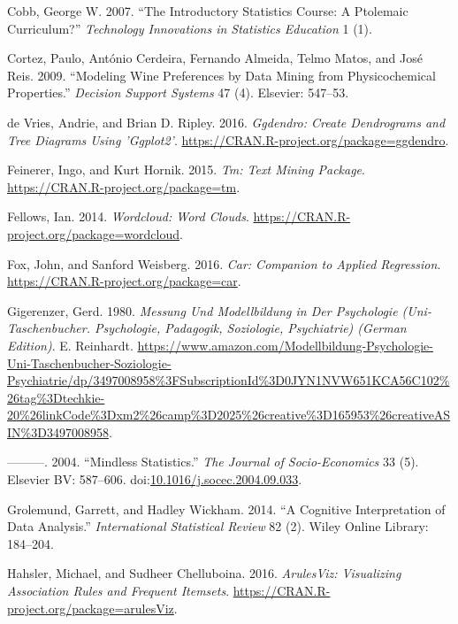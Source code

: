 \documentclass[12pt,]{book}
\begin{document}
\hypertarget{ref-cobb2007introductory}{}
Cobb, George W. 2007. ``The Introductory Statistics Course: A Ptolemaic
Curriculum?'' \emph{Technology Innovations in Statistics Education} 1
(1).

\hypertarget{ref-cortez2009modeling}{}
Cortez, Paulo, António Cerdeira, Fernando Almeida, Telmo Matos, and José
Reis. 2009. ``Modeling Wine Preferences by Data Mining from
Physicochemical Properties.'' \emph{Decision Support Systems} 47 (4).
Elsevier: 547--53.

\hypertarget{ref-R-ggdendro}{}
de Vries, Andrie, and Brian D. Ripley. 2016. \emph{Ggdendro: Create
Dendrograms and Tree Diagrams Using 'Ggplot2'}.
\url{https://CRAN.R-project.org/package=ggdendro}.

\hypertarget{ref-R-tm}{}
Feinerer, Ingo, and Kurt Hornik. 2015. \emph{Tm: Text Mining Package}.
\url{https://CRAN.R-project.org/package=tm}.

\hypertarget{ref-R-wordcloud}{}
Fellows, Ian. 2014. \emph{Wordcloud: Word Clouds}.
\url{https://CRAN.R-project.org/package=wordcloud}.

\hypertarget{ref-R-car}{}
Fox, John, and Sanford Weisberg. 2016. \emph{Car: Companion to Applied
Regression}. \url{https://CRAN.R-project.org/package=car}.

\hypertarget{ref-9783497008957}{}
Gigerenzer, Gerd. 1980. \emph{Messung Und Modellbildung in Der
Psychologie (Uni-Taschenbucher. Psychologie, Padagogik, Soziologie,
Psychiatrie) (German Edition)}. E. Reinhardt.
\url{https://www.amazon.com/Modellbildung-Psychologie-Uni-Taschenbucher-Soziologie-Psychiatrie/dp/3497008958\%3FSubscriptionId\%3D0JYN1NVW651KCA56C102\%26tag\%3Dtechkie-20\%26linkCode\%3Dxm2\%26camp\%3D2025\%26creative\%3D165953\%26creativeASIN\%3D3497008958}.

\hypertarget{ref-Gigerenzer2004}{}
---------. 2004. ``Mindless Statistics.'' \emph{The Journal of
Socio-Economics} 33 (5). Elsevier BV: 587--606.
doi:\href{https://doi.org/10.1016/j.socec.2004.09.033}{10.1016/j.socec.2004.09.033}.

\hypertarget{ref-grolemund2014cognitive}{}
Grolemund, Garrett, and Hadley Wickham. 2014. ``A Cognitive
Interpretation of Data Analysis.'' \emph{International Statistical
Review} 82 (2). Wiley Online Library: 184--204.

\hypertarget{ref-R-arulesViz}{}
Hahsler, Michael, and Sudheer Chelluboina. 2016. \emph{ArulesViz:
Visualizing Association Rules and Frequent Itemsets}.
\url{https://CRAN.R-project.org/package=arulesViz}.
\end{document}

